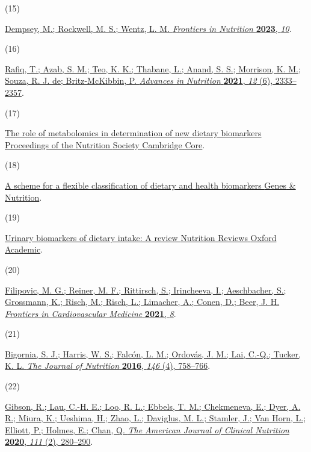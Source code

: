 \documentclass[journal=jacsat,manuscript=article]{achemso}
\newlength{\cslhangindent}
\newlength{\csllabelwidth}
\newenvironment{CSLReferences}[2] %
 {\begin{list}{}{%
  \setlength{\itemindent}{0pt}
  \setlength{\leftmargin}{0pt}
  \setlength{\parsep}{0pt}
  \ifodd #1
   \setlength{\leftmargin}{\cslhangindent}
   \setlength{\itemindent}{-1\cslhangindent}
  \fi
  \setlength{\itemsep}{#2\baselineskip}}}
 {\end{list}}
\newcommand{\CSLLeftMargin}[1]{\parbox[t]{\csllabelwidth}{#1}}
\newcommand{\CSLRightInline}[1]{\parbox[t]{\linewidth - \csllabelwidth}{#1}\break}
\begin{document}
\begin{CSLReferences}{0}{0}
\CSLLeftMargin{(15) }%
\CSLRightInline{\href{https://doi.org/10.3389/fnut.2023.1072653}{Dempsey,
M.; Rockwell, M. S.; Wentz, L. M. \emph{Frontiers in Nutrition}
\textbf{2023}, \emph{10}}.}

\CSLLeftMargin{(16) }%
\CSLRightInline{\href{https://doi.org/10.1093/advances/nmab054}{Rafiq,
T.; Azab, S. M.; Teo, K. K.; Thabane, L.; Anand, S. S.; Morrison, K. M.;
Souza, R. J. de; Britz-McKibbin, P. \emph{Advances in Nutrition}
\textbf{2021}, \emph{12} (6), 2333--2357}.}

\CSLLeftMargin{(17) }%
\CSLRightInline{\href{https://www.cambridge.org/core/journals/proceedings-of-the-nutrition-society/article/role-of-metabolomics-in-determination-of-new-dietary-biomarkers/E267A2C47DECFB3B863C29760F85F1E1\#}{The
role of metabolomics in determination of new dietary biomarkers
{\textbar} {Proceedings} of the {Nutrition} {Society} {\textbar}
{Cambridge} {Core}}.}

\CSLLeftMargin{(18) }%
\CSLRightInline{\href{https://link.springer.com/article/10.1186/s12263-017-0587-x}{A
scheme for a flexible classification of dietary and health biomarkers
{\textbar} {Genes} \& {Nutrition}}.}

\CSLLeftMargin{(19) }%
\CSLRightInline{\href{https://academic.oup.com/nutritionreviews/article/78/5/364/5610624}{Urinary
biomarkers of dietary intake: A review {\textbar} {Nutrition} {Reviews}
{\textbar} {Oxford} {Academic}}.}

\CSLLeftMargin{(20) }%
\CSLRightInline{\href{https://doi.org/10.3389/fcvm.2021.622619}{Filipovic,
M. G.; Reiner, M. F.; Rittirsch, S.; Irincheeva, I.; Aeschbacher, S.;
Grossmann, K.; Risch, M.; Risch, L.; Limacher, A.; Conen, D.; Beer, J.
H. \emph{Frontiers in Cardiovascular Medicine} \textbf{2021},
\emph{8}}.}

\CSLLeftMargin{(21) }%
\CSLRightInline{\href{https://doi.org/10.3945/jn.115.222562}{Bigornia,
S. J.; Harris, W. S.; Falcón, L. M.; Ordovás, J. M.; Lai, C.-Q.; Tucker,
K. L. \emph{The Journal of Nutrition} \textbf{2016}, \emph{146} (4),
758--766}.}

\CSLLeftMargin{(22) }%
\CSLRightInline{\href{https://doi.org/10.1093/ajcn/nqz293}{Gibson, R.;
Lau, C.-H. E.; Loo, R. L.; Ebbels, T. M.; Chekmeneva, E.; Dyer, A. R.;
Miura, K.; Ueshima, H.; Zhao, L.; Daviglus, M. L.; Stamler, J.; Van
Horn, L.; Elliott, P.; Holmes, E.; Chan, Q. \emph{The American Journal
of Clinical Nutrition} \textbf{2020}, \emph{111} (2), 280--290}.}


\end{CSLReferences}
\end{document}
